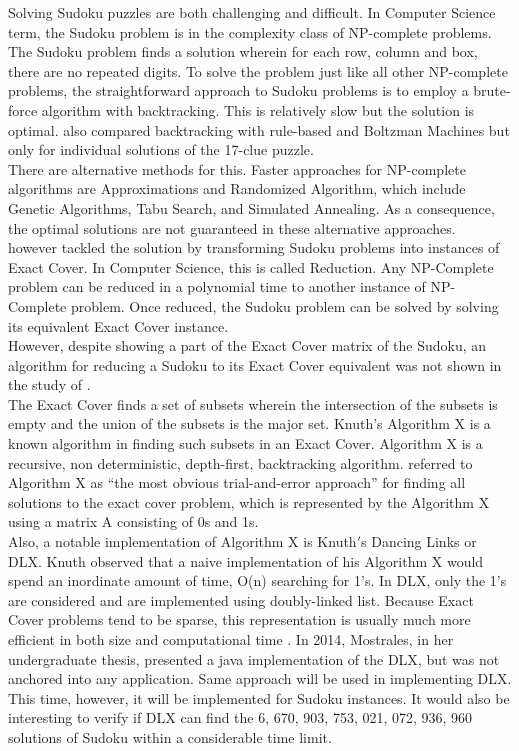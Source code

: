 \documentclass[a4paper,oneside,11pt]{report}
\begin{document}
Solving Sudoku puzzles are both challenging and difficult. In Computer Science term, the Sudoku problem is in the complexity class of NP-complete problems. The Sudoku problem finds a solution wherein for each row, column and box, there are no repeated digits. To solve the problem just like all other NP-complete problems, the straightforward approach to Sudoku problems is to employ a brute-force algorithm with backtracking. This is relatively slow but the solution is optimal. \cite{Berggren} also compared backtracking with rule-based and Boltzman Machines but only for individual solutions of the 17-clue puzzle.\\

There are alternative methods for this. Faster approaches for NP-complete algorithms are Approximations and Randomized Algorithm, which include Genetic Algorithms, Tabu Search, and Simulated Annealing. As a consequence, the optimal solutions are not guaranteed in these alternative approaches.\\

\cite{Harrysson} however tackled the solution by transforming Sudoku problems into instances of Exact Cover. In Computer Science, this is called Reduction. Any NP-Complete problem can be reduced in a polynomial time to another instance of NP-Complete problem. Once reduced, the Sudoku problem can be solved by solving its equivalent Exact Cover instance.\\

However, despite showing a part of the Exact Cover matrix of the Sudoku, an algorithm for reducing a Sudoku to its Exact Cover equivalent was not shown in the study of \cite{Harrysson}.\\

The Exact Cover finds a set of subsets wherein the intersection of the subsets is empty and the union of the subsets is the major set. Knuth$’$s Algorithm X is a known algorithm in finding such subsets in an Exact Cover. Algorithm X is a recursive, non deterministic, depth-first, backtracking algorithm. \cite{Knuth} referred to Algorithm X as “the most obvious trial-and-error approach” for finding all solutions to the exact cover problem, which is represented by the Algorithm X using  a matrix A consisting of 0s and 1s.\\

Also, a notable implementation of Algorithm X is Knuth$'$s Dancing Links or DLX. Knuth observed that a naive implementation of his Algorithm X would spend an inordinate amount of time, O(n) searching for 1’s. In DLX, only the 1’s are considered and are implemented using doubly-linked list. Because Exact Cover problems tend to be sparse, this representation is usually much more efficient in both size and computational time \cite{Dahlke}. In 2014, Mostrales, in her undergraduate thesis, presented a java implementation of the DLX, but was not anchored into any application. Same approach will be used in implementing DLX. This time, however, it will be implemented for Sudoku instances. It would also be interesting to verify if DLX can find the 6, 670, 903, 753, 021, 072, 936, 960 solutions of Sudoku within a considerable time limit.\\
\end{document}
